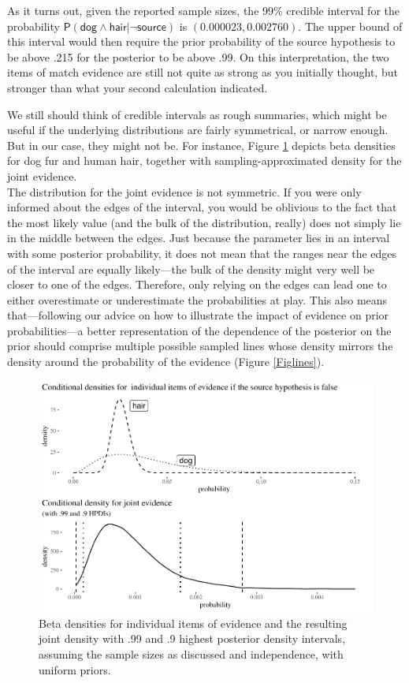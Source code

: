 \documentclass[
  10pt,
  dvipsnames,enabledeprecatedfontcommands]{scrartcl}
\newcommand{\s}[1]{\mbox{$\mathsf{#1}$}}
\begin{document}
As it turns out, given the reported sample sizes, the 99\% credible
interval for the probability
\(\mathsf{P}(\s{dog}\wedge \s{hair} \vert \neg \s{source})\) is
\((0.000023, 0.002760)\). The upper bound of this interval would then
require the prior probability of the source hypothesis to be above .215
for the posterior to be above .99. On this interpretation, the two items
of match evidence are still not quite as strong as you initially
thought, but stronger than what your second calculation indicated.

We still should think of credible intervals as rough summaries, which
might be useful if the underlying distributions are fairly symmetrical,
or narrow enough. But in our case, they might not be. For instance,
Figure \ref{Figdensities} depicts beta densities for dog fur and human
hair, together with sampling-approximated density for the joint
evidence.\\
The distribution for the joint evidence is not symmetric. If you were
only informed about the edges of the interval, you would be oblivious to
the fact that the most likely value (and the bulk of the distribution,
really) does not simply lie in the middle between the edges. Just
because the parameter lies in an interval with some posterior
probability, it does not mean that the ranges near the edges of the
interval are equally likely---the bulk of the density might very well be
closer to one of the edges. Therefore, only relying on the edges can
lead one to either overestimate or underestimate the probabilities at
play. This also means that---following our advice on how to illustrate
the impact of evidence on prior probabilities---a better representation
of the dependence of the posterior on the prior should comprise multiple
possible sampled lines whose density mirrors the density around the
probability of the evidence (Figure \ref{Figlines}).

\begin{figure}[H]

\begin{center}\includegraphics[width=0.8\linewidth]{imprecision_philosophical_paper2_files/figure-latex/Figdensities-1} \end{center}
\caption{Beta densities for individual items of evidence and the resulting joint density with .99 and .9 highest posterior density intervals, assuming the sample sizes as discussed and independence, with uniform priors.}
\label{Figdensities}
\end{figure}
\end{document}
